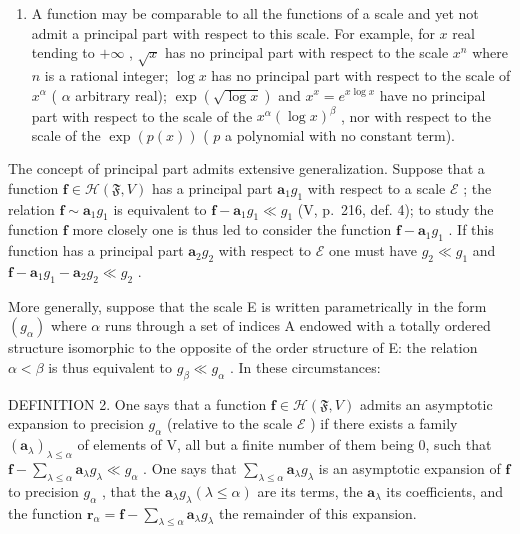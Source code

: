 \begin{enumerate}
\def\labelenumi{\arabic{enumi})}
\setcounter{enumi}{1}
\tightlist
\item
  A function may be comparable to all the functions of a scale and yet not admit a principal part with respect to this scale. For example, for \(x\) real tending to \(+\infty\) , \(\sqrt{x}\) has no principal part with respect to the scale \(x^n\) where \(n\) is a rational integer; \(\log x\) has no principal part with respect to the scale of \(x^\alpha\) ( \(\alpha\) arbitrary real); \(\exp(\sqrt{\log x})\) and \(x^x = e^{x\log x}\) have no principal part with respect to the scale of the \(x^\alpha (\log x)^\beta\) , nor with respect to the scale of the \(\exp(p(x))\) ( \(p\) a polynomial with no constant term).
\end{enumerate}

The concept of principal part admits extensive generalization. Suppose that a function \(\mathbf{f} \in \mathcal{H}(\mathfrak{F}, V)\) has a principal part \(\mathbf{a}_1g_1\) with respect to a scale \(\mathcal{E}\) ; the relation \(\mathbf{f} \sim \mathbf{a}_1g_1\) is equivalent to \(\mathbf{f} - \mathbf{a}_1g_1 \ll g_1\) (V, p.~216, def. 4); to study the function \(\mathbf{f}\) more closely one is thus led to consider the function \(\mathbf{f} - \mathbf{a}_1g_1\) . If this function has a principal part \(\mathbf{a}_2g_2\) with respect to \(\mathcal{E}\) one must have \(g_2 \ll g_1\) and \(\mathbf{f} - \mathbf{a}_1g_1 - \mathbf{a}_2g_2 \ll g_2\) .

More generally, suppose that the scale E is written parametrically in the form \((g_{\alpha})\) where \(\alpha\) runs through a set of indices A endowed with a totally ordered structure isomorphic to the opposite of the order structure of E: the relation \(\alpha < \beta\) is thus equivalent to \(g_{\beta} \ll g_{\alpha}\) . In these circumstances:

DEFINITION 2. One says that a function \(\mathbf{f} \in \mathcal{H}(\mathfrak{F}, V)\) admits an asymptotic expansion to precision \(g_{\alpha}\) (relative to the scale \(\mathcal{E}\) ) if there exists a family \((\mathbf{a}_{\lambda})_{\lambda \leqslant \alpha}\) of elements of V, all but a finite number of them being 0, such that \(\mathbf{f} - \sum_{\lambda \leqslant \alpha} \mathbf{a}_{\lambda} g_{\lambda} \ll g_{\alpha}\) . One says that \(\sum_{\lambda \leqslant \alpha} \mathbf{a}_{\lambda} g_{\lambda}\) is an asymptotic expansion of \(\mathbf{f}\) to precision \(g_{\alpha}\) , that the \(\mathbf{a}_{\lambda} g_{\lambda} (\lambda \leqslant \alpha)\) are its terms, the \(\mathbf{a}_{\lambda}\) its coefficients, and the function \(\mathbf{r}_{\alpha} = \mathbf{f} - \sum_{\lambda \leqslant \alpha} \mathbf{a}_{\lambda} g_{\lambda}\) the remainder of this expansion.

